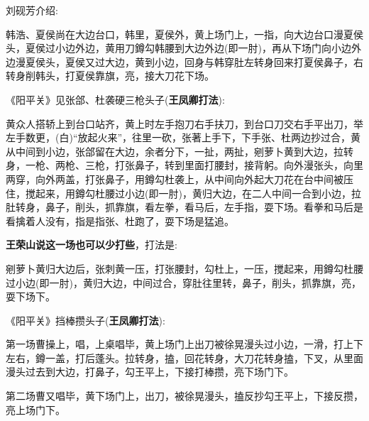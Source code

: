 {\hei 刘砚芳介绍}:~

韩浩、夏侯尚在大边台口，韩里，夏侯外，黄上场门上，一指，向大边台口漫夏侯头，夏侯过小边外边，黄用刀鐏勾韩腰到大边外边(即一肘)，再从下场门向小边外边漫夏侯头，夏侯又过大边，黄到小边，回身与韩穿肚左转身回来打夏侯鼻子，右转身削韩头，打夏侯靠旗，亮，接大刀花下场。

《阳平关》见张郃、杜袭硬三枪头子({\bfseries\hwfs 王凤卿打法}):~

黄众人搭轿上到台口站齐，黄上时左手抱刀右手扶刀，到台口刀交右手平出刀，举左手数更，({\akai 白})``放起火来''，往里一砍，张著上手下，下手张、杜两边抄过合，黄从中间到小边，张郃留在大边，余者分下，一扯，两扯，剜萝卜黄到大边，拉转身，一枪、两枪、三枪，打张鼻子，转到里面打腰封，接背躬。向外漫张头，向里两穿，向外两盖，打张鼻子，用鐏勾杜袭上，从中间向外起大刀花在台中间被压住，搅起来，用鐏勾杜腰过小边(即一肘)，黄归大边，在二人中间一合到小边，拉肚转身，鼻子，削头，抓靠旗，看左拳，看马后，左手指，耍下场。看拳和马后是看擒着人没有，指是指张、杜跑了，耍下场是猛追。

{\bfseries\hwfs 王荣山说这一场也可以少打些}，打法是:~

剜萝卜黄归大边后，张刺黄一压，打张腰封，勾杜上，一压，搅起来，用鐏勾杜腰过小边(即一肘)，黄归大边，中间过合，穿肚往里转，鼻子，削头，抓靠旗，亮，耍下场下。

《阳平关》挡棒攒头子({\bfseries\hwfs 王凤卿打法}):~

第一场曹操上，唱，上桌唱毕，黄上场门上出刀被徐晃漫头过小边，一滑，打上下左右，鐏一盖，打后蓬头。拉转身，搕，回花转身，大刀花转身搕，下叉，从里面漫头过去到大边，打鼻子，勾王平上，下接打棒攒，亮下场门下。

第二场曹又唱毕，黄下场门上，出刀，被徐晃漫头，搕反抄勾王平上，下接反攒，亮上场门下。

